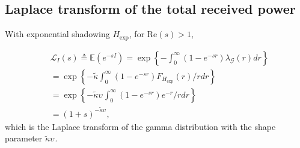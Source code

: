 \documentclass[lettersize,journal]{IEEEtran}
\begin{document}





\subsection{Laplace transform of the total received power}

With exponential shadowing ${H}_{\text{exp}}$, for Re$(s)>1$,

\begin{align}
  \label{eq:lapdef}
  &\mathcal{L}_{I}(s)\triangleq \mathbb{E}\left(e^{-sI}\right)= \exp\left\{-\int_0^{\infty}(1-e^{-sr}) \lambda_{\mathcal{G}}(r) dr \right\} \nonumber \\
  &=\exp\left\{-\tilde{\kappa}\int_0^{\infty}(1-e^{-sr}) F_{{H}_{\text{exp}}}(r) /r dr \right\} \nonumber \\
  &=\exp\left\{-\tilde{\kappa}\upsilon_{}\int_0^{\infty}(1-e^{-sr}) e^{-r} /r dr \right\} \nonumber \\
  &=(1+s)^{-\tilde{\kappa}\upsilon_{}},
\end{align}
which is the Laplace transform of the gamma distribution with the shape parameter $\tilde{\kappa}\upsilon_{}$. 
\end{document}
